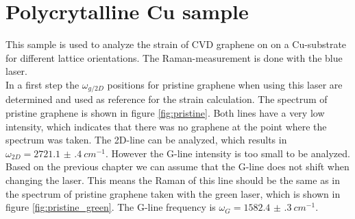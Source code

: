 \documentclass[12pt,a4paper]{article}
\begin{document}
\section{Polycrytalline Cu sample}
\label{sec:8}
This sample is used to analyze the strain of CVD graphene on on a Cu-substrate for different lattice orientations. The Raman-measurement is done with the blue laser.\\ In a first step the $\omega_{g/2D}$ positions for pristine graphene when using this laser are determined and used as reference for the strain calculation. The spectrum of pristine graphene is shown in figure \ref{fig:pristine}. Both lines have a very low intensity, which indicates that there was no graphene at the point where the spectrum was taken. The 2D-line can be analyzed, which results in  $\omega_{2D} = \SI{2721.1(4)}{cm^{-1}}$. However the G-line intensity is too small to be analyzed. Based on the previous chapter we can assume that the G-line does not shift when changing the laser. This means the Raman of this line should be the same as in the spectrum of pristine graphene taken with the green laser, which is shown in figure \ref{fig:pristine_green}. The G-line frequency is $\omega_{G} = \SI{1582.4(3)}{cm^{-1}}$.\\
\end{document}
